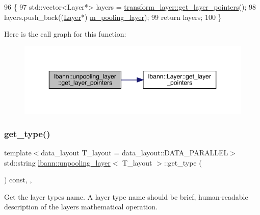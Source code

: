 \begin{DoxyCode}
96                                                   \{
97     std::vector<Layer*> layers = \hyperlink{classlbann_1_1Layer_a9f94210cbb973f1df89ef649899094a1}{transform\_layer::get\_layer\_pointers}();
98     layers.push\_back((\hyperlink{classlbann_1_1Layer_a24e9c82354a0a2af1b70cbca2211e7d4}{Layer}*) \hyperlink{classlbann_1_1unpooling__layer_ab15a8b0680685f80c7d995e617e97a9a}{m\_pooling\_layer});
99     \textcolor{keywordflow}{return} layers;
100   \}
\end{DoxyCode}
Here is the call graph for this function\+:\nopagebreak
\begin{figure}[H]
\begin{center}
\leavevmode
\includegraphics[width=350pt]{classlbann_1_1unpooling__layer_a33e17164da27e3370fb3f362dd2e6c13_cgraph}
\end{center}
\end{figure}
\mbox{\label{classlbann_1_1unpooling__layer_a62d5cc8bb9c2c5fa7b4b82ee8de9d8e6}} 
\subsubsection{\texorpdfstring{get\+\_\+type()}{get\_type()}}
{\footnotesize\ttfamily template$<$data\+\_\+layout T\+\_\+layout = data\+\_\+layout\+::\+D\+A\+T\+A\+\_\+\+P\+A\+R\+A\+L\+L\+EL$>$ \\
std\+::string \hyperlink{classlbann_1_1unpooling__layer}{lbann\+::unpooling\+\_\+layer}$<$ T\+\_\+layout $>$\+::get\+\_\+type (\begin{DoxyParamCaption}{ }\end{DoxyParamCaption}) const\hspace{0.3cm}{\ttfamily [inline]}, {\ttfamily [override]}, {\ttfamily [virtual]}}

Get the layer type\textquotesingle{}s name. A layer type name should be brief, human-\/readable description of the layer\textquotesingle{}s mathematical operation. 

